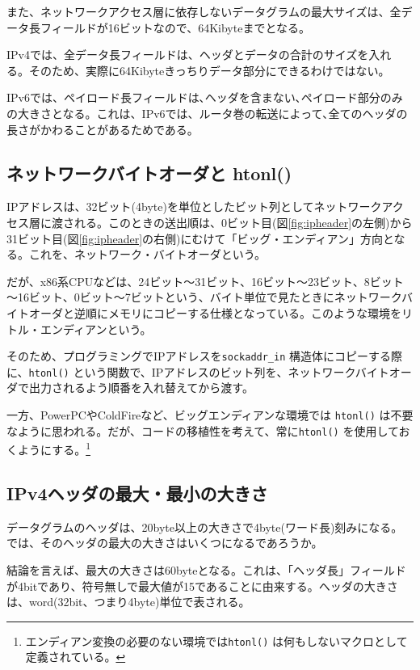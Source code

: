 また、ネットワークアクセス層に依存しないデータグラムの最大サイズは、全データ長フィールドが16ビットなので、64Kibyteまでとなる。

IPv4では、全データ長フィールドは、ヘッダとデータの合計のサイズを入れる。そのため、実際に64Kibyteきっちりデータ部分にできるわけではない。

IPv6では、ペイロード長フィールドは､ヘッダを含まない､ペイロード部分のみの大きさとなる。これは、IPv6では、ルータ巻の転送によって､全てのヘッダの長さがかわることがあるためである。

\subsection{ネットワークバイトオーダと htonl()}

IPアドレスは、32ビット(4byte)を単位としたビット列としてネットワークアクセス層に渡される。このときの送出順は、0ビット目(図\ref{fig:ipheader}の左側)から31ビット目(図\ref{fig:ipheader}の右側)にむけて「ビッグ・エンディアン」方向となる。これを、ネットワーク・バイトオーダという。

だが、x86系CPUなどは、24ビット～31ビット、16ビット～23ビット、8ビット～16ビット、0ビット～7ビットという、バイト単位で見たときにネットワークバイトオーダと逆順にメモリにコピーする仕様となっている。このような環境をリトル・エンディアンという。

そのため、プログラミングでIPアドレスを\verb+sockaddr_in+ 構造体にコピーする際に、\verb+htonl()+ という関数で、IPアドレスのビット列を、ネットワークバイトオーダで出力されるよう順番を入れ替えてから渡す。

一方、PowerPCやColdFireなど、ビッグエンディアンな環境では \verb+htonl()+ は不要なように思われる。だが、コードの移植性を考えて、常に\verb+htonl()+ を使用しておくようにする。\footnote{エンディアン変換の必要のない環境では\verb+htonl()+ は何もしないマクロとして定義されている。}


\subsection{IPv4ヘッダの最大・最小の大きさ}

データグラムのヘッダは、20byte以上の大きさで4byte(ワード長)刻みになる。では、そのヘッダの最大の大きさはいくつになるであろうか。

結論を言えば、最大の大きさは60byteとなる。これは、「ヘッダ長」フィールドが4bitであり、符号無しで最大値が15であることに由来する。ヘッダの大きさは、word(32bit、つまり4byte)単位で表される。


